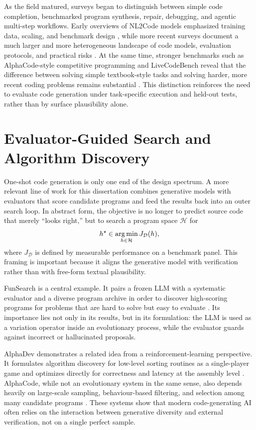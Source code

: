 As the field matured, surveys began to distinguish between simple code completion, benchmarked
program synthesis, repair, debugging, and agentic multi-step workflows. Early overviews of
NL2Code models emphasized training data, scaling, and benchmark design \cite{zan2023nl2code},
while more recent surveys document a much larger and more heterogeneous landscape of code models,
evaluation protocols, and practical risks \cite{jiang2024codesurvey}. At the same time, stronger
benchmarks such as AlphaCode-style competitive programming and LiveCodeBench reveal that the
difference between solving simple textbook-style tasks and solving harder, more recent coding
problems remains substantial \cite{li2022alphacode,jain2024livecodebench}. This distinction
reinforces the need to evaluate code generation under task-specific execution and held-out tests,
rather than by surface plausibility alone.

\section{Evaluator-Guided Search and Algorithm Discovery}
\label{sec:lit-evaluator-search}

One-shot code generation is only one end of the design spectrum. A more relevant line of work for
this dissertation combines generative models with evaluators that score candidate programs and feed
the results back into an outer search loop. In abstract form, the objective is no longer to
predict source code that merely ``looks right,'' but to search a program space $\mathcal{H}$ for
\begin{equation}
h^{\star} \in \operatorname*{arg\,min}_{h \in \mathcal{H}} J_{\mathcal{D}}(h),
\label{eq:lit-program-search}
\end{equation}
where $J_{\mathcal{D}}$ is defined by measurable performance on a benchmark panel. This framing is
important because it aligns the generative model with verification rather than with free-form
textual plausibility.

FunSearch is a central example. It pairs a frozen LLM with a systematic evaluator and a diverse
program archive in order to discover high-scoring programs for problems that are hard to solve but
easy to evaluate \cite{romeraparedes2024funsearch}. Its importance lies not only in its results,
but in its formulation: the LLM is used as a variation operator inside an evolutionary process,
while the evaluator guards against incorrect or hallucinated proposals.

AlphaDev demonstrates a related idea from a reinforcement-learning perspective. It formulates
algorithm discovery for low-level sorting routines as a single-player game and optimizes directly
for correctness and latency at the assembly level \cite{mankowitz2023alphadev}. AlphaCode, while
not an evolutionary system in the same sense, also depends heavily on large-scale sampling,
behaviour-based filtering, and selection among many candidate programs \cite{li2022alphacode}.
These systems show that modern code-generating AI often relies on the interaction between
generative diversity and external verification, not on a single perfect sample.

